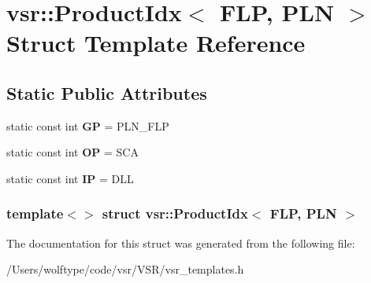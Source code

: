 \hypertarget{structvsr_1_1_product_idx_3_01_f_l_p_00_01_p_l_n_01_4}{\section{vsr\-:\-:Product\-Idx$<$ F\-L\-P, P\-L\-N $>$ Struct Template Reference}
\label{structvsr_1_1_product_idx_3_01_f_l_p_00_01_p_l_n_01_4}
}
\subsection*{Static Public Attributes}
\begin{DoxyCompactItemize}
\item 
\hypertarget{structvsr_1_1_product_idx_3_01_f_l_p_00_01_p_l_n_01_4_ad51fbded88cc43918a5e4c679d6407cd}{static const int {\bfseries G\-P} = P\-L\-N\-\_\-\-F\-L\-P}\label{structvsr_1_1_product_idx_3_01_f_l_p_00_01_p_l_n_01_4_ad51fbded88cc43918a5e4c679d6407cd}

\item 
\hypertarget{structvsr_1_1_product_idx_3_01_f_l_p_00_01_p_l_n_01_4_ac2a304e212d14036fd1fa1c920a447fc}{static const int {\bfseries O\-P} = S\-C\-A}\label{structvsr_1_1_product_idx_3_01_f_l_p_00_01_p_l_n_01_4_ac2a304e212d14036fd1fa1c920a447fc}

\item 
\hypertarget{structvsr_1_1_product_idx_3_01_f_l_p_00_01_p_l_n_01_4_a24918a61e5e318f57d4178ba2eb1b6cf}{static const int {\bfseries I\-P} = D\-L\-L}\label{structvsr_1_1_product_idx_3_01_f_l_p_00_01_p_l_n_01_4_a24918a61e5e318f57d4178ba2eb1b6cf}

\end{DoxyCompactItemize}
\subsubsection*{template$<$$>$ struct vsr\-::\-Product\-Idx$<$ F\-L\-P, P\-L\-N $>$}



The documentation for this struct was generated from the following file\-:\begin{DoxyCompactItemize}
\item 
/\-Users/wolftype/code/vsr/\-V\-S\-R/vsr\-\_\-templates.\-h\end{DoxyCompactItemize}
